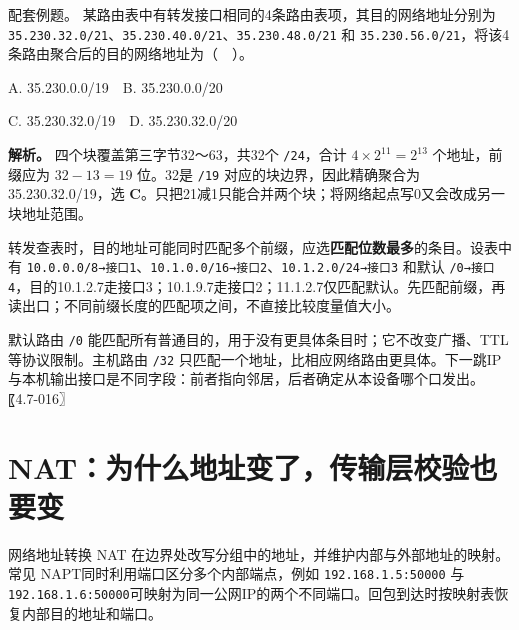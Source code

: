 \begin{example}[配套例题]

配套例题。 某路由表中有转发接口相同的4条路由表项，其目的网络地址分别为 \texttt{35.\allowbreak{}230.\allowbreak{}32.\allowbreak{}0/\allowbreak{}21}、\texttt{35.\allowbreak{}230.\allowbreak{}40.\allowbreak{}0/\allowbreak{}21}、\texttt{35.\allowbreak{}230.\allowbreak{}48.\allowbreak{}0/\allowbreak{}21} 和 \texttt{35.\allowbreak{}230.\allowbreak{}56.\allowbreak{}0/\allowbreak{}21}，将该4条路由聚合后的目的网络地址为（　）。

A. 35.230.0.0/19　B. 35.230.0.0/20

C. 35.230.32.0/19　D. 35.230.32.0/20

\end{example}

\textbf{解析。} 四个块覆盖第三字节32～63，共32个 \texttt{/\allowbreak{}24}，合计 \(4\times2^{11}=2^{13}\) 个地址，前缀应为 \(32-13=19\) 位。32是 \texttt{/\allowbreak{}19} 对应的块边界，因此精确聚合为35.230.32.0/19，选 \textbf{C}。只把21减1只能合并两个块；将网络起点写0又会改成另一块地址范围。

转发查表时，目的地址可能同时匹配多个前缀，应选\textbf{匹配位数最多}的条目。设表中有 \texttt{10.\allowbreak{}0.\allowbreak{}0.\allowbreak{}0/\allowbreak{}8→接口1}、\texttt{10.\allowbreak{}1.\allowbreak{}0.\allowbreak{}0/\allowbreak{}16→接口2}、\texttt{10.\allowbreak{}1.\allowbreak{}2.\allowbreak{}0/\allowbreak{}24→接口3} 和默认 \texttt{/\allowbreak{}0→接口4}，目的10.1.2.7走接口3；10.1.9.7走接口2；11.1.2.7仅匹配默认。先匹配前缀，再读出口；不同前缀长度的匹配项之间，不直接比较度量值大小。

默认路由 \texttt{/\allowbreak{}0} 能匹配所有普通目的，用于没有更具体条目时；它不改变广播、TTL等协议限制。主机路由 \texttt{/\allowbreak{}32} 只匹配一个地址，比相应网络路由更具体。下一跳IP与本机输出接口是不同字段：前者指向邻居，后者确定从本设备哪个口发出。〖4.7-016〗

\section{NAT：为什么地址变了，传输层校验也要变}\label{CN04-10}

网络地址转换 NAT 在边界处改写分组中的地址，并维护内部与外部地址的映射。常见 NAPT同时利用端口区分多个内部端点，例如 \texttt{192.\allowbreak{}168.\allowbreak{}1.\allowbreak{}5:\allowbreak{}50000} 与 \texttt{192.\allowbreak{}168.\allowbreak{}1.\allowbreak{}6:\allowbreak{}50000}可映射为同一公网IP的两个不同端口。回包到达时按映射表恢复内部目的地址和端口。

